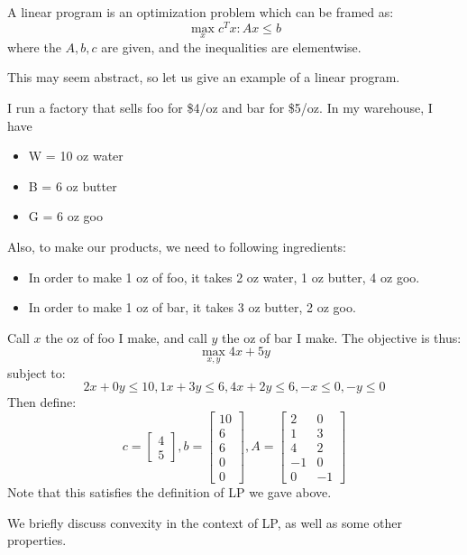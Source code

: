 \begin{definition}
    A linear program is an optimization problem which can be framed as:
    \[ \max_{x} c^T x : Ax \leq b \]
    where the $A, b, c$ are given, and the inequalities are elementwise.
\end{definition}

This may seem abstract, so let us give an example of a linear program.
\begin{example}
    I run a factory that sells foo for \$4/oz and bar for \$5/oz. In my warehouse, I have
    \begin{itemize}
        \item W = 10 oz water
        \item B = 6 oz butter
        \item G = 6 oz goo
    \end{itemize}
    Also, to make our products, we need to following ingredients:
    \begin{itemize}
        \item In order to make 1 oz of foo, it takes 2 oz water, 1 oz butter, 4 oz goo.
        \item In order to make 1 oz of bar, it takes 3 oz butter, 2 oz goo.
    \end{itemize}
    Call $x$ the oz of foo I make, and call $y$ the oz of bar I make.
    The objective is thus:
    \[ \max_{x, y} 4x + 5y \]
    subject to:
    \[ 2x + 0y \leq 10, 1x + 3y \leq 6, 4x + 2y \leq 6, -x \leq 0, -y \leq 0 \]
    Then define:
    \[ c = \begin{bmatrix}
        4 \\ 5
    \end{bmatrix}, b = \begin{bmatrix}
        10 \\ 6 \\ 6 \\ 0 \\ 0
    \end{bmatrix},
    A = \begin{bmatrix}
        2 & 0 \\ 1 & 3 \\ 4 & 2 \\ -1 & 0 \\ 0 & -1
    \end{bmatrix}\]
    Note that this satisfies the definition of LP we gave above.
\end{example}

We briefly discuss convexity in the context of LP, as well as some other properties.

